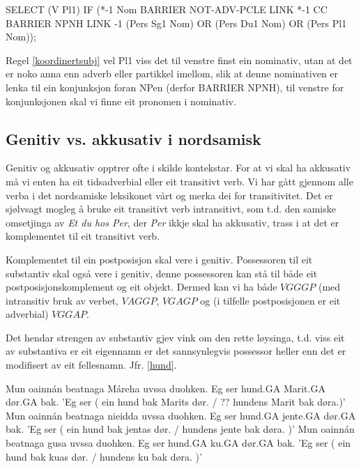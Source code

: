 \documentclass[a4paper,norsk]{article}
\begin{document}
\begin{example}\label{koordinertsubj}
SELECT (V Pl1) IF (*-1 Nom BARRIER NOT-ADV-PCLE LINK *-1 CC BARRIER NPNH
	LINK -1 (Pers Sg1 Nom) OR (Pers Du1 Nom) OR (Pers Pl1 Nom));
\end{example}%

Regel \ref{koordinertsubj} vel Pl1 viss det til venstre finst ein nominativ, utan at det er noko anna enn adverb eller partikkel imellom, slik at denne nominativen er lenka til ein konjunksjon foran NPen (derfor BARRIER NPNH), til venstre for konjunksjonen skal vi finne eit pronomen i nominativ. %





\subsection{Genitiv vs. akkusativ i nordsamisk}

Genitiv og akkusativ opptrer ofte i skilde kontekstar. For at vi skal ha akkusativ må vi enten ha eit tidsadverbial eller eit transitivt verb. Vi har gått gjennom alle verba i det nordsamiske leksikonet vårt og merka dei for transitivitet. Det er sjølvsagt mogleg å bruke eit transitivt  verb intransitivt, som t.d. den samiske omsetjinga av \textit{Et du hos Per}, der \textit{Per} ikkje skal ha akkusativ, trass i at det er komplementet til eit transitivt verb. %

Komplementet til ein postposisjon skal vere i genitiv. Possessoren til eit substantiv skal også vere i genitiv, denne possessoren kan stå til både eit postposisjonskomplement og eit objekt. Dermed kan vi ha både $VGGGP$ (med intransitiv bruk av verbet, $VAGGP$, $VGAGP$ og (i tilfelle postposisjonen er eit adverbial) $VGGAP$. %

Det hendar strengen av substantiv gjev vink om den rette løysinga, t.d. viss eit av substantiva er eit eigennamn er det sannsynlegvis possessor heller enn det er modifisert av eit fellesnamn. Jfr. \ref{hund}. %

\begin{example}\label{hund}
\gll Mun oainnán beatnaga Máreha uvssa duohken.
 Eg ser hund.GA Marit.GA dør.GA bak.
\glt 'Eg ser ( ein hund bak Marits dør. / ?? hundens Marit bak døra.)'
\glend
\gll Mun oainnán beatnaga nieidda uvssa duohken.
  Eg ser hund.GA jente.GA dør.GA bak.
\glt 'Eg ser ( ein hund bak jentas dør. / hundens jente bak døra. )'
\glend
\gll Mun oainnán beatnaga gusa uvssa duohken.
  Eg ser hund.GA ku.GA dør.GA bak.
\glt 'Eg ser ( ein hund bak kuas dør. / hundens ku bak døra. )'
\glend
\end{example}
\end{document}

